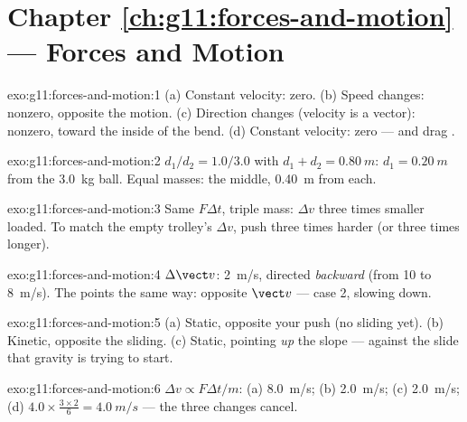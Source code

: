\section*{Chapter \ref{ch:g11:forces-and-motion} --- Forces and Motion}

\begin{solution}{exo:g11:forces-and-motion:1}
(a) Constant velocity:  zero. (b) Speed changes: nonzero,
opposite the motion. (c) Direction changes (velocity is a vector):
nonzero, toward the inside of the bend. (d) Constant velocity: zero ---
 and drag .
\end{solution}

\begin{solution}{exo:g11:forces-and-motion:2}
$d_1/d_2 = 1.0/3.0$ with $d_1 + d_2 = \qty{0.80}{m}$:
$d_1 = \qty{0.20}{m}$ from the \qty{3.0}{kg} ball. Equal masses: the
middle, \qty{0.40}{m} from each.
\end{solution}

\begin{solution}{exo:g11:forces-and-motion:3}
Same $F\Delta t$, triple mass: $\Delta v$ three times smaller loaded.
To match the empty trolley's $\Delta v$, push three times harder (or
three times longer).
\end{solution}

\begin{solution}{exo:g11:forces-and-motion:4}
$\Delta \vect v$: \qty{2}{m/s}, directed \emph{backward} (from
\num{10} to \qty{8}{m/s}). The  points the same way:
opposite $\vect v$ --- case 2, slowing down.
\end{solution}

\begin{solution}{exo:g11:forces-and-motion:5}
(a) Static, opposite your push (no sliding yet). (b) Kinetic, opposite
the sliding. (c) Static, pointing \emph{up} the slope --- against the
slide that gravity is trying to start.
\end{solution}

\begin{solution}{exo:g11:forces-and-motion:6}
$\Delta v \propto F\Delta t/m$: (a) \qty{8.0}{m/s}; (b) \qty{2.0}{m/s};
(c) \qty{2.0}{m/s}; (d) $4.0 \times \frac{3 \times 2}{6} =
\qty{4.0}{m/s}$ --- the three changes cancel.
\end{solution}

